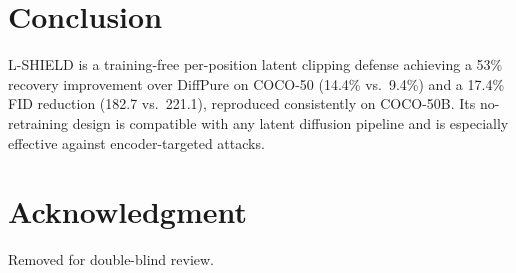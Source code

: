 \documentclass[conference]{IEEEtran}
\begin{document}
\section{Conclusion}

L-SHIELD is a training-free per-position latent clipping defense achieving
a 53\% recovery improvement over DiffPure on COCO-50 (14.4\% vs.\ 9.4\%)
and a 17.4\% FID reduction (182.7 vs.\ 221.1), reproduced consistently on
COCO-50B. Its no-retraining design is compatible with any latent diffusion
pipeline and is especially effective against encoder-targeted attacks.

\section*{Acknowledgment}
Removed for double-blind review.

\balance


\end{document}
